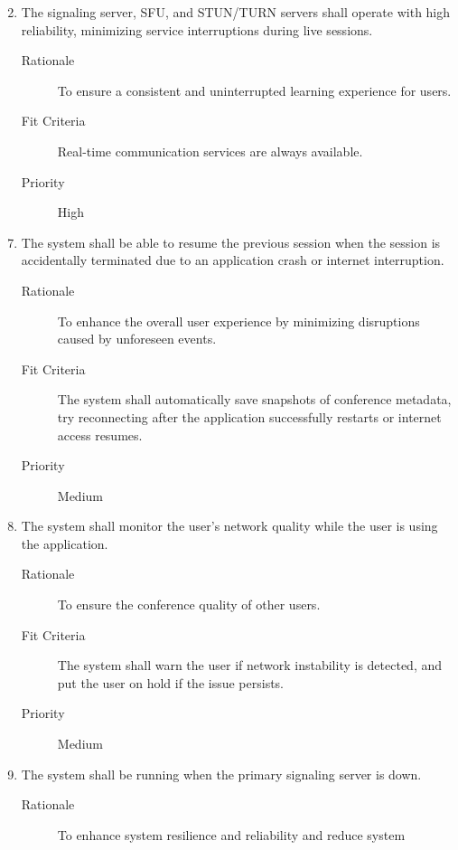 \documentclass{article}
\begin{document}
\begin{enumerate}[PR1]
  \setcounter{enumi}{1}
\item The signaling server, SFU, and STUN/TURN servers shall operate with high
  reliability, minimizing service interruptions during live
  sessions. \label{PR2}
  \begin{description}
  \item[Rationale] To ensure a consistent and uninterrupted learning experience for users.
  \item[Fit Criteria] Real-time communication services are always available.
  \item[Priority] High
  \end{description}
\end{enumerate}
\begin{enumerate}[label=\textbf{PR\arabic*}]
  \setcounter{enumi}{6}
\item The system shall be able to resume the previous session when the session is
  accidentally terminated due to an application crash or internet interruption.
  \label{PR7}
	\begin{description}
  \item[Rationale] To enhance the overall user experience by minimizing disruptions
    caused by unforeseen events.
	\item[Fit Criteria] The system shall automatically save snapshots of conference
    metadata, try reconnecting after the application successfully restarts or
    internet access resumes.
	\item[Priority] Medium
  \end{description}
\item The system shall monitor the user's network quality while the user is using
  the application. \label{PR8}
	\begin{description}
  \item[Rationale] To ensure the conference quality of other users.
	\item[Fit Criteria] The system shall warn the user if network instability is
    detected, and put the user on hold if the issue persists.
	\item[Priority] Medium
  \end{description}
\item The system shall be running when the primary signaling server is
  down. \label{PR9}
	\begin{description}
  \item[Rationale] To enhance system resilience and reliability and reduce system

\end{description}
\end{enumerate}
\end{document}
